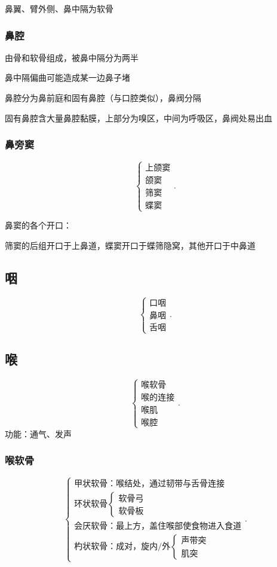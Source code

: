 鼻翼、臂外侧、鼻中隔为软骨
\subsubsection*{鼻腔}%
\label{subsub:鼻腔}
由骨和软骨组成，被鼻中隔分为两半
\begin{notation}
    鼻中隔偏曲可能造成某一边鼻子堵
\end{notation}
鼻腔分为鼻前庭和固有鼻腔（与口腔类似），鼻阀分隔

固有鼻腔含大量鼻腔黏膜，上部分为嗅区，中间为呼吸区，鼻阀处易出血
\subsubsection*{鼻旁窦}%
\label{subsub:鼻旁窦}
\[
    \begin{cases}
        \text{上颌窦}\\
        \text{颌窦}\\
        \text{筛窦}\\
        \text{蝶窦}
    \end{cases}
.\] 
\begin{notation}
    鼻窦的各个开口：

    筛窦的后组开口于上鼻道，蝶窦开口于蝶筛隐窝，其他开口于中鼻道
\end{notation}
\subsection{咽}%
\label{sub:鼻咽}
\[
    \begin{cases}
        \text{口咽}\\
        \text{鼻咽}\\
        \text{舌咽}
    \end{cases}
.\] 
\subsection{喉}%
\label{sub:喉}
\[
    \begin{cases}
        \text{喉软骨}\\
        \text{喉的连接}\\
        \text{喉肌}\\
        \text{喉腔}
    \end{cases}
.\] 
功能：通气、发声
\subsubsection*{喉软骨}%
\label{subsub:喉软骨}
\[
    \begin{cases}
        \text{甲状软骨：喉结处，通过韧带与舌骨连接}\\
        \text{环状软骨}\begin{cases}
            \text{软骨弓}\\
            \text{软骨板}
        \end{cases}\\
        \text{会厌软骨：最上方，盖住喉部使食物进入食道}\\
        \text{杓状软骨：成对，旋内/外}\begin{cases}
            \text{声带突}\\
            \text{肌突}
        \end{cases}
    \end{cases}
.\] 
